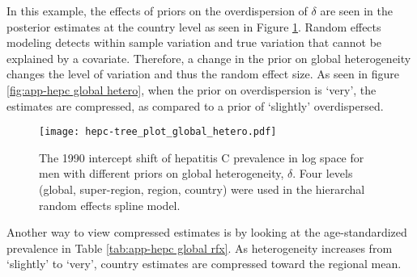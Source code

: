 In this example, the effects of priors on the overdispersion of
$\delta$ are seen in the posterior estimates at the country level as
seen in Figure \ref{fig:app-hepc global hetero}.  Random effects
modeling detects within sample variation and true variation that
cannot be explained by a covariate.  Therefore, a change in the prior
on global heterogeneity changes the level of variation and thus the
random effect size.  As seen in figure \ref{fig:app-hepc global
  hetero}, when the prior on overdispersion is `very', the estimates
are compressed, as compared to a prior of `slightly' overdispersed.

    \begin{figure}[h]
        \begin{center}
            \texttt{[image: hepc-tree\_plot\_global\_hetero.pdf]}
            \caption{The 1990 intercept shift of hepatitis C
              prevalence in log space for men with different priors on
              global heterogeneity, $\delta$.  Four levels (global,
              super-region, region, country) were used in the
              hierarchal random effects spline model.}
            \label{fig:app-hepc global hetero}
        \end{center}
    \end{figure}

Another way to view compressed estimates is by looking at the
age-standardized prevalence in Table \ref{tab:app-hepc global rfx}.
As heterogeneity increases from `slightly' to `very', country
estimates are compressed toward the regional mean.

